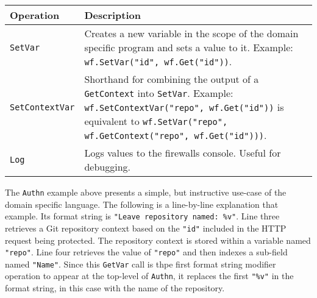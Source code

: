 \begin{table}[h]
\centering

\begin{tabular}{ m{2.5cm} m{11.5cm}  } 
 \hline
 Operation & Description \\ 
 \hline \hline

 \lstinline|SetVar| & Creates a new variable in the scope of the domain specific program and sets a value to it. \newline Example: \lstinline|wf.SetVar("id", wf.Get("id"))|. \\ \hline

 \lstinline|SetContextVar| & Shorthand for combining the output of a \lstinline|GetContext| into \lstinline|SetVar|. \newline Example: \lstinline|wf.SetContextVar("repo", wf.Get("id"))| is equivalent to \lstinline|wf.SetVar("repo", wf.GetContext("repo", wf.Get("id")))|. \\ \hline

 \lstinline|Log| & Logs values to the firewalls console. Useful for debugging. \\ \hline

\end{tabular}
\label{Table:DSL_SetterOperations}
\end{table}





The \lstinline{Authn} example above presents a simple, but instructive use-case of the domain specific language. The following is a line-by-line explanation that example. Its format string is \lstinline{"Leave repository named: %v"}. Line three retrieves a Git repository context based on the \lstinline{"id"} included in the HTTP request being protected. The repository context is stored within a variable named \lstinline{"repo"}. Line four retrieves the value of \lstinline{"repo"} and then indexes a sub-field named \lstinline{"Name"}. Since this \lstinline{GetVar} call is thpe first format string modifier operation to appear at the top-level of \lstinline{Authn}, it replaces the first \lstinline{"%v"} in the format string, in this case with the name of the repository.

